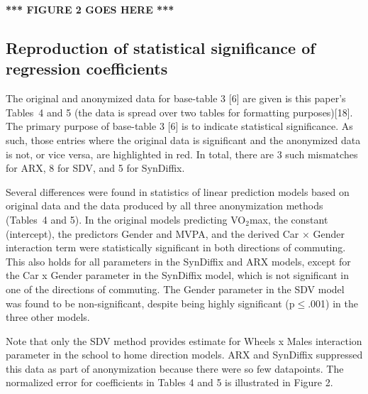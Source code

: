 \documentclass[10pt]{article}
\newcommand{\mycite}[1]{[#1]}
\begin{document}

\textbf{*** FIGURE 2 GOES HERE ***}

\subsection*{Reproduction of statistical significance of regression coefficients}

The original and anonymized data for base-table 3 \mycite{6} are given is this paper's Tables~4 and 5 (the data is spread over two tables for formatting purposes)\mycite{18}. The primary purpose of base-table 3 \mycite{6} is to indicate statistical significance. As such, those entries where the original data is significant and the anonymized data is not, or vice versa, are highlighted in red. In total, there are 3 such mismatches for ARX, 8 for SDV, and 5 for SynDiffix.

Several differences were found in statistics of linear prediction models based on original data and the data produced by all three anonymization methods (Tables~4 and 5). In the original models predicting VO$_2$max, the constant (intercept), the predictors Gender and MVPA, and the derived Car × Gender interaction term were statistically significant in both directions of commuting. This also holds for all parameters in the SynDiffix and ARX models, except for the Car x Gender parameter in the SynDiffix model, which is not significant in one of the directions of commuting. The Gender parameter in the SDV model was found to be non-significant, despite being highly significant (p$\leq$.001) in the three other models.

Note that only the SDV method provides estimate for Wheels x Males interaction parameter in the school to home direction models. ARX and SynDiffix suppressed this data as part of anonymization because there were so few datapoints.
%
The normalized error for coefficients in Tables 4 and 5 is illustrated in Figure 2.
\end{document}
